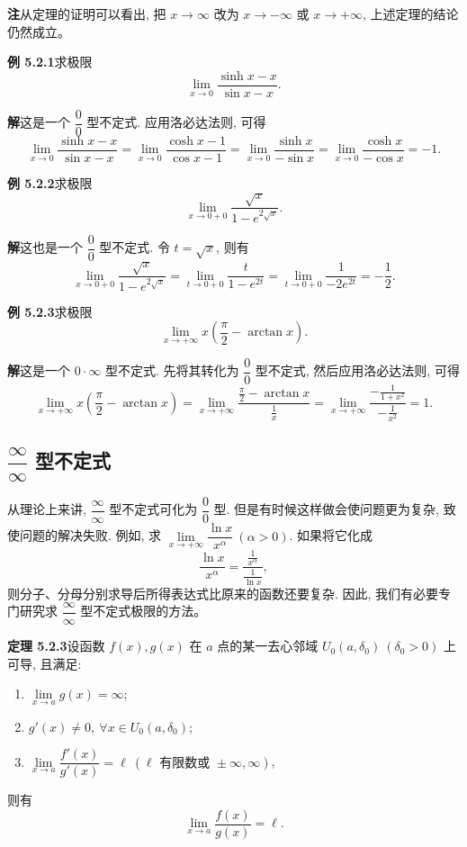 \documentclass[UTF8,12pt,a4paper,fontset=fandol]{ctexart}
\begin{document}
\noindent\textbf{注}\quad 从定理的证明可以看出, 把 $x\to\infty$ 改为 $x\to-\infty$ 或 $x\to+\infty$, 上述定理的结论仍然成立。

\noindent\textbf{例 5.2.1}\quad 求极限
\[
  \lim_{x\to0}\frac{\sinh x-x}{\sin x-x}.
\]

\noindent\textbf{解}\quad 这是一个 $\dfrac00$ 型不定式. 应用洛必达法则, 可得
\[
  \lim_{x\to0}\frac{\sinh x-x}{\sin x-x}
  =
  \lim_{x\to0}\frac{\cosh x-1}{\cos x-1}
  =
  \lim_{x\to0}\frac{\sinh x}{-\sin x}
  =
  \lim_{x\to0}\frac{\cosh x}{-\cos x}
  =
  -1.
\]

\noindent\textbf{例 5.2.2}\quad 求极限
\[
  \lim_{x\to0+0}\frac{\sqrt{x}}{1-e^{2\sqrt{x}}}.
\]

\noindent\textbf{解}\quad 这也是一个 $\dfrac00$ 型不定式. 令 $t=\sqrt{x}$, 则有
\[
  \lim_{x\to0+0}\frac{\sqrt{x}}{1-e^{2\sqrt{x}}}
  =
  \lim_{t\to0+0}\frac{t}{1-e^{2t}}
  =
  \lim_{t\to0+0}\frac1{-2e^{2t}}
  =
  -\frac12.
\]

\noindent\textbf{例 5.2.3}\quad 求极限
\[
  \lim_{x\to+\infty}x\left(\frac\pi2-\arctan x\right).
\]

\noindent\textbf{解}\quad 这是一个 $0\cdot\infty$ 型不定式. 先将其转化为 $\dfrac00$ 型不定式, 然后应用洛必达法则, 可得
\[
  \lim_{x\to+\infty}x\left(\frac\pi2-\arctan x\right)
  =
  \lim_{x\to+\infty}
  \frac{\frac\pi2-\arctan x}{\frac1x}
  =
  \lim_{x\to+\infty}
  \frac{-\frac1{1+x^2}}{-\frac1{x^2}}
  =
  1.
\]

\subsection{$\dfrac\infty\infty$ 型不定式}

从理论上来讲, $\dfrac\infty\infty$ 型不定式可化为 $\dfrac00$ 型. 但是有时候这样做会使问题更为复杂, 致使问题的解决失败. 例如, 求 $\lim\limits_{x\to+\infty}\dfrac{\ln x}{x^\alpha}\ (\alpha>0)$. 如果将它化成
\[
  \frac{\ln x}{x^\alpha}
  =
  \frac{\frac1{x^\alpha}}{\frac1{\ln x}},
\]
则分子、分母分别求导后所得表达式比原来的函数还要复杂. 因此, 我们有必要专门研究求 $\dfrac\infty\infty$ 型不定式极限的方法。

\noindent\textbf{定理 5.2.3}\quad 设函数 $f(x),g(x)$ 在 $a$ 点的某一去心邻域 $U_0(a,\delta_0)\ (\delta_0>0)$ 上可导, 且满足:
\begin{enumerate}
  \item $\lim\limits_{x\to a}g(x)=\infty$;
  \item $g'(x)\ne0,\ \forall x\in U_0(a,\delta_0)$;
  \item $\lim\limits_{x\to a}\dfrac{f'(x)}{g'(x)}=\ell\ (\ell\text{ 有限数或 }\pm\infty,\infty)$,
\end{enumerate}
则有
\[
  \lim_{x\to a}\frac{f(x)}{g(x)}=\ell.
\]
\end{document}
